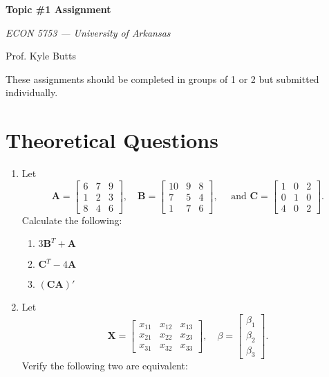 \documentclass[12pt]{article}
\begin{document}
\begin{center}
  {\Huge\bf Topic \#1 Assignment}
  
  \smallskip
  {\large\it  ECON 5753 — University of Arkansas}

  \medskip
  {\large Prof. Kyle Butts}
\end{center}

These assignments should be completed in groups of 1 or 2 but submitted individually. 

\section*{Theoretical Questions}

\begin{enumerate}
  \item Let 
  $$
    \bm{A} = \begin{bmatrix} 6 & 7 & 9 \\ 1 & 2 & 3 \\ 8 & 4 & 6 \end{bmatrix}, 
    \quad 
    \bm{B} = \begin{bmatrix} 10 & 9 & 8 \\ 7 & 5 & 4 \\ 1 & 7 & 6 \end{bmatrix},
    \quad \text{ and } 
    \bm{C} = \begin{bmatrix} 1 & 0 & 2 \\ 0 & 1 & 0 \\ 4 & 0 & 2 \end{bmatrix}.
  $$ 
  Calculate the following:
  
  \begin{enumerate}
    \item $3\bm{B}^T + \bm{A}$
    \item $\bm{C}^T - 4\bm{A}$
    \item $(\bm{C}\bm{A})'$
  \end{enumerate}
  
  \bigskip\bigskip
  \item Let 
  $$
    \bm{X} = \begin{bmatrix} x_{11} & x_{12} & x_{13} \\ x_{21} & x_{22} & x_{23} \\ x_{31} & x_{32} & x_{33} \end{bmatrix}, 
    \quad 
    \beta = \begin{bmatrix} \beta_1 \\ \beta_2 \\ \beta_3 \end{bmatrix}.
  $$ 
  Verify the following two are equivalent:


\end{enumerate}
\end{document}
